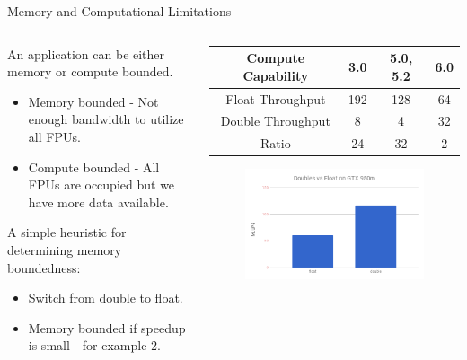 \documentclass[9pt]{beamer}
\begin{document}
\begin{frame}[t]{Memory and Computational Limitations}
\begin{columns}

\begin{column}{0.5\textwidth}
An application can be either memory or compute bounded. 
\begin{itemize}
	\item Memory bounded - Not enough bandwidth to utilize all FPUs.
	\item Compute bounded - All FPUs are occupied but we have more data available. 
\end{itemize}

\bigskip
\pause

A simple heuristic for determining memory boundedness: 

\begin{itemize}
	\item Switch from double to float. 
    \item Memory bounded if speedup is small - for example 2. 
\end{itemize}

\end{column}

\pause

\begin{column}{0.5\textwidth}
\begin{center}

\begin{tabular}{|c|c|c|c|}
\hline
Compute Capability & 3.0 & 5.0, 5.2 & \color{red} 6.0 \\
\hline
Float Throughput & 192 & 128 & \color{red} 64  \\
\hline
Double Throughput & 8 & 4 & \color{red} 32 \\
\hline
Ratio & 24 & 32 & \color{red} 2\\
\hline
\end{tabular}

\bigskip
\bigskip

\begin{figure}
\begin{center}
\includegraphics[scale=0.25]{images/doubles_vs_floats.png}
\end{center}
\end{figure}


\end{center}
\end{column}
\end{columns}
\end{frame}
\end{document}
